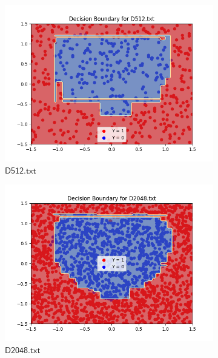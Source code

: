 \documentclass[a4paper]{article}
\theoremstyle{definition}
\newenvironment{soln}{
    \leavevmode\color{blue}\ignorespaces
}{}
\begin{document}
\begin{enumerate}
\begin{soln}
\begin{figure}[H]
\begin{subfigure}{0.5\textwidth}
          \centering
          \includegraphics[width=1.1\linewidth]{Decision_Boundary_D512.png}
          \caption{$\mathsf{D512.txt}$}
          \label{fig:7sub3}
        \end{subfigure}%
        \begin{subfigure}{0.5\textwidth}
          \centering
          \includegraphics[width=1.1\linewidth]{Decision_Boundary_D2048.png}
          \caption{$\mathsf{D2048.txt}$}
          \label{fig:7sub4}
          \end{subfigure}
          \centering
          \begin{subfigure}{0.5\textwidth}
          \centering

\end{subfigure}
\end{figure}
\end{soln}
\end{enumerate}
\end{document}
